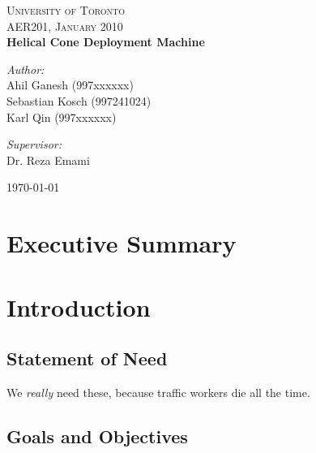 \documentclass[11pt]{report}
\begin{document}
\begin{titlepage}
 \begin{center}

\textsc{\large University of Toronto}\\[1.1cm]
\textsc{\normalsize AER201, January 2010}\\[1.5cm]


{ \huge \bfseries Helical Cone Deployment Machine}\\[2.4cm]

\begin{minipage}{0.4\textwidth}
\begin{flushleft} \large
\emph{Author:}\\
Ahil Ganesh (997xxxxxx)\\
Sebastian Kosch (997241024)\\
Karl Qin (997xxxxxx)\\
\end{flushleft}
\end{minipage}
\begin{minipage}{0.4\textwidth}
\begin{flushright} \large
\emph{Supervisor:} \\
Dr. Reza Emami
\end{flushright}
\end{minipage}

\vfill

{\large \today}

\end{center}
\end{titlepage}

\chapter{Executive Summary}


\chapter{Introduction}

\section{Statement of Need}

We \textit{really} need these, because traffic workers die all the time.

\section{Goals and Objectives}
\end{document}

